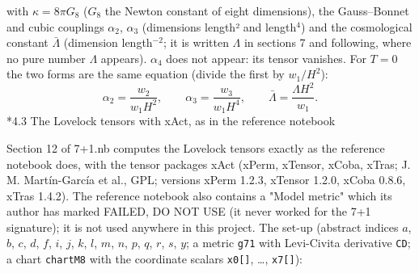 \documentclass[10pt,a4paper]{article}
\makeatletter
\renewcommand\subsection{\@startsection{subsection}{2}{\z@}{-3.25ex\@plus -1ex \@minus -.2ex}{1.5ex \@plus .2ex}{\normalfont\large\bfseries\raggedright}}
\makeatother
\begin{document}
with $\kappa=8\pi G_8$ ($G_8$ the Newton constant of eight dimensions), the Gauss–Bonnet and cubic couplings $\alpha_2$, $\alpha_3$ (dimensions length² and length\texorpdfstring{\ensuremath{{}^{4}}}{⁴}) and the cosmological constant $\bar\Lambda$ (dimension length$^{-2}$; it is written $\Lambda$ in sections 7 and following, where no pure number $\Lambda$ appears). $\alpha_4$ does not appear: its tensor vanishes. For $T=0$ the two forms are the same equation (divide the first by $w_1/H^2$):
\begin{equation*}
\alpha_2=\frac{w_2}{w_1H^2},\qquad \alpha_3=\frac{w_3}{w_1H^4},\qquad \bar\Lambda=\frac{\Lambda H^2}{w_1}.
\end{equation*}
\subsection*{4.3 The Lovelock tensors with xAct, as in the reference notebook}
Section 12 of 7+1.nb computes the Lovelock tensors exactly as the reference notebook does, with the tensor packages xAct (xPerm, xTensor, xCoba, xTras; J. M. Martín-García et al., GPL; versions xPerm 1.2.3, xTensor 1.2.0, xCoba 0.8.6, xTras 1.4.2). The reference notebook also contains a "Model metric" which its author has marked FAILED, DO NOT USE (it never worked for the 7+1 signature); it is not used anywhere in this project. The set-up (abstract indices $a$, $b$, $c$, $d$, $f$, $i$, $j$, $k$, $l$, $m$, $n$, $p$, $q$, $r$, $s$, $y$; a metric \texttt{g71} with Levi-Civita derivative \texttt{CD}; a chart \texttt{chartM8} with the coordinate scalars \texttt{x0[]}, …, \texttt{x7[]}):
\end{document}
